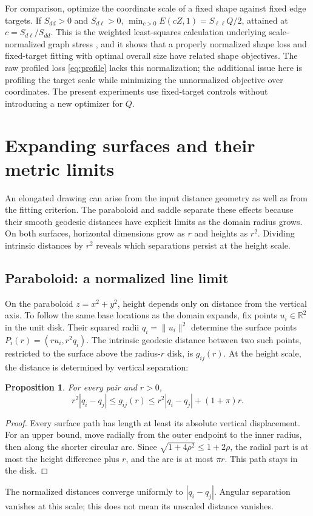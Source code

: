 \documentclass[11pt]{article}
\newtheorem{proposition}{Proposition}
\newcommand{\R}{\mathbb R}
\newcommand{\norm}[1]{\lVert#1\rVert}
\begin{document}
For comparison, optimize the coordinate scale of a fixed shape against fixed
edge targets. If $S_{dd}>0$ and $S_{d\ell}>0$,
$\min_{c>0}E(cZ,1)=S_{\ell\ell}Q/2$, attained at $c=S_{d\ell}/S_{dd}$. This is the weighted least-squares calculation underlying
scale-normalized graph stress \citep[Section 3.2]{ahmed2026}, and it shows
that a properly normalized shape loss and fixed-target fitting with optimal
overall size have related shape objectives. The raw profiled loss
\eqref{eq:profile} lacks this normalization; the additional issue here is
profiling the target scale while minimizing the unnormalized objective over
coordinates. The present experiments use fixed-target controls without
introducing a new optimizer for $Q$.

\section{Expanding surfaces and their metric limits}\label{sec:limits}
An elongated drawing can arise from the input distance geometry as well as
from the fitting criterion. The paraboloid and saddle separate these effects
because their smooth geodesic distances have explicit limits as the domain
radius grows. On both surfaces, horizontal dimensions grow as $r$ and heights
as $r^2$. Dividing intrinsic distances by $r^2$ reveals which separations
persist at the height scale.

\subsection{Paraboloid: a normalized line limit}
On the paraboloid $z=x^2+y^2$, height depends only on distance from the
vertical axis. To follow the same base locations as the domain expands,
fix points $u_i\in\R^2$ in the unit disk. Their squared radii
$q_i=\norm{u_i}^2$ determine the surface points
$P_i(r)=(ru_i,r^2q_i)$. The intrinsic geodesic distance between two such
points, restricted to the surface above the radius-$r$ disk, is $g_{ij}(r)$.
At the height scale, the distance is determined by vertical separation:
\begin{proposition}\label{prop:paraboloid}
For every pair and $r>0$,
\[
 r^2|q_i-q_j|\le g_{ij}(r)\le r^2|q_i-q_j|+(1+\pi)r.
\]
\end{proposition}
\begin{proof}
Every surface path has length at least its absolute vertical displacement.
For an upper bound, move radially from the outer endpoint to the inner radius,
then along the shorter circular arc. Since
$\sqrt{1+4\rho^2}\le1+2\rho$, the radial part is at most the height difference
plus $r$, and the arc is at most $\pi r$. This path stays in the disk.
\end{proof}
The normalized distances converge uniformly to $|q_i-q_j|$. Angular separation
vanishes at this scale; this does not mean its unscaled distance vanishes.
\end{document}
